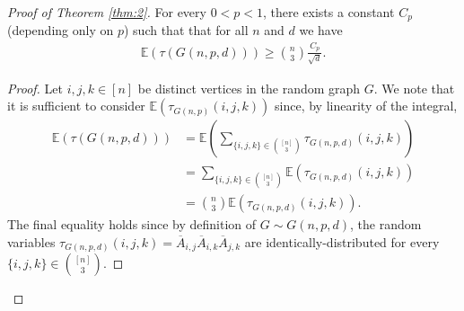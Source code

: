 \documentclass{article}
\newenvironment{manuallemma}[1]{%
  \renewcommand\themanuallemmainner{#1}%
  \manuallemmainner
}{\endmanualtheoreminner}
\begin{document}
\begin{proof}[Proof of Theorem \ref{thm:2}]
\begin{manuallemma}{3}\label{lm:3}
    For every $0 < p < 1$, there exists a constant $C_p$ (depending only on $p$) such that that for all $n$ and $d$ we have 
    \begin{align*}
        \mathbb{E}(\tau(G(n,p,d))) \geq \binom{n}{3} \frac{C_p}{\sqrt{d}}.
    \end{align*}
\end{manuallemma}
\begin{proof}
Let $i, j, k \in [n]$ be distinct vertices in the random graph $G$. We note that it is sufficient to consider $\mathbb{E}(\tau_{G(n,p)}(i,j,k))$ since, by linearity of the integral,
\begin{align*}
    \mathbb{E} \left(\tau(G(n,p,d)) \right) &= \mathbb{E} \left( \sum\limits_{ \{i,j,k\} \in \binom{[n]}{3}} \tau_{G(n,p,d)}(i,j,k) \right)\\
    &= \sum\limits_{ \{i,j,k\} \in \binom{[n]}{3}} \mathbb{E} \left( \tau_{G(n,p,d)}(i,j,k) \right)\\
    &= \binom{n}{3} \mathbb{E} \left( \tau_{G(n,p,d)}(i,j,k) \right).
\end{align*}
The final equality holds since by definition of $G \sim G(n, p,d)$, the random variables $\tau_{G(n,p,d)}(i,j,k) = \overline{A}_{i,j}\overline{A}_{i,k}\overline{A}_{j,k}$ are identically-distributed for every $\{i,j,k\} \in \binom{[n]}{3}$.


\end{proof}
\end{proof}
\end{document}
